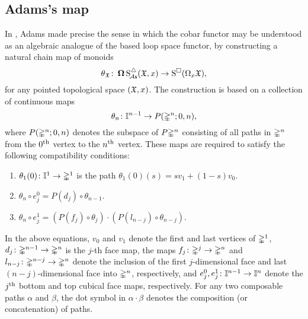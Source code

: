 
\subsection{Adams's map}\label{ss:adams maps} 
In \cite{adams1956cobar}, Adams made precise the sense in which the cobar functor may be understood as an algebraic analogue of the based loop space functor, by constructing a natural chain map of monoids
\begin{equation}\label{e:adams map 2}
	\theta_{\mathfrak{X}} \colon \operatorname{\mathbf{\Omega}} \operatorname{S^{\triangle}_{\!{\mathcal{A}\mathsf{s}}}}(\mathfrak{X},x) \to \operatorname{S^{\square}}(\Omega_x \mathfrak{X}),
\end{equation}
for any pointed topological space $(\mathfrak{X},x)$.
The construction is based on a collection of continuous maps
\[
\theta_n \colon \mathbb{I}^{n-1} \to P(\mathbb{\Delta}^n;0,n),
\]
where $P(\mathbb{\Delta}^n;0,n)$ denotes the subspace of $P \mathbb{\Delta}^n$ consisting of all paths in $\mathbb{\Delta}^n$ from the $0^{\mathrm{th}}$ vertex to the $n^{\mathrm{th}}$ vertex. These maps are required to satisfy the following compatibility conditions:
\begin{enumerate}
	\item $\theta_1(0)\colon \mathbb{I}^1 \to \mathbb{\Delta}^1$ is the path $\theta_1(0)(s) = sv_1 +(1-s)v_0$.
	\item $\theta_n \circ e_j^0 = P(d_j) \circ \theta_{n-1}$.
	\item $\theta_n \circ e_j^1 = (P(f_j) \circ \theta_j) \cdot (P(l_{n-j}) \circ \theta_{n-j})$.
\end{enumerate}
In the above equations, $v_0$ and $v_1$ denote the first and last vertices of $\mathbb{\Delta}^1$, $d_j \colon \mathbb{\Delta}^{n-1} \to \mathbb{\Delta}^n$ is the $j$-th face map, the maps $f_j\colon \mathbb{\Delta}^j \rightarrow \mathbb{\Delta}^n$ and $l_{n-j}\colon \mathbb{\Delta}^{n-j} \rightarrow \mathbb{\Delta}^n$ denote the inclusion of the first $j$-dimensional face and last $(n-j)$-dimensional face into $\mathbb{\Delta}^n$, respectively, and
$e_j^0,e_j^1\colon \mathbb{I}^{n-1} \rightarrow \mathbb{I}^{n}$ denote the $j^{\mathrm{th}}$ bottom and top cubical face maps, respectively.
For any two composable paths $\alpha$ and $\beta$, the dot symbol in $\alpha \cdot \beta$ denotes the composition (or concatenation) of paths.

